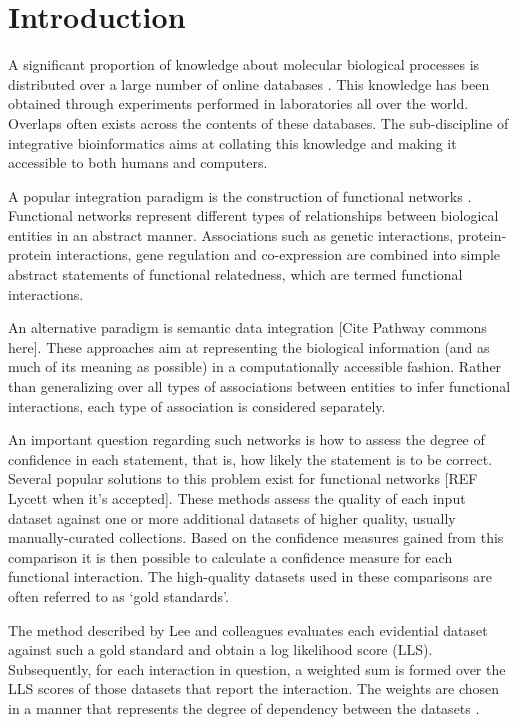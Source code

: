 \documentclass{bioinfo}
\newcommand{\note}[1]{{\color{red}[#1]}}
\begin{document}
\section{Introduction} 

A significant proportion of knowledge about molecular biological processes is distributed over a large number of online databases \citep{stein_creating_2002}. This knowledge has been obtained through experiments performed in laboratories all over the world. Overlaps often exists across the contents of these databases. The sub-discipline of integrative bioinformatics aims at collating this knowledge and making it accessible to both humans and computers. 

A popular integration paradigm is the construction of functional networks \citep{lee_probabilistic_2004,von_mering_string:_2003,james_integration_2009}. Functional networks represent different types of relationships between biological entities in an abstract manner. Associations such as genetic interactions, protein-protein interactions, gene regulation and co-expression are combined into simple abstract statements of functional relatedness, which are termed functional interactions.

An alternative paradigm is semantic data integration \citep{cheung_yeasthub:_2005,smith_obo_2007,koehler_graph-based_2006}\note{Cite Pathway commons here}. These approaches aim at representing the biological information (and as much of its meaning as possible) in a computationally accessible fashion. Rather than generalizing over all types of associations between entities to infer functional interactions, each type of association is considered separately.

An important question regarding such networks is how to assess the degree of confidence in each statement, that is, how likely the statement is to be correct. Several popular solutions to this problem exist for functional networks \citep{lee_probabilistic_2004}\note{REF Lycett when it's accepted}.
These methods assess the quality of each input dataset against one or more additional datasets of higher quality, usually manually-curated collections. Based on the confidence measures gained from this comparison it is then possible to calculate a confidence measure for each functional interaction. The high-quality datasets used in these comparisons are often referred to as `gold standards'. 

The method described by Lee and colleagues evaluates each evidential dataset against such a gold standard and obtain a log likelihood score (LLS). Subsequently, for each interaction in question, a weighted sum is formed over the LLS scores of those datasets that report the interaction. The weights are chosen in a manner that represents the degree of dependency between the datasets \citep{lee_probabilistic_2004}.
\end{document}
